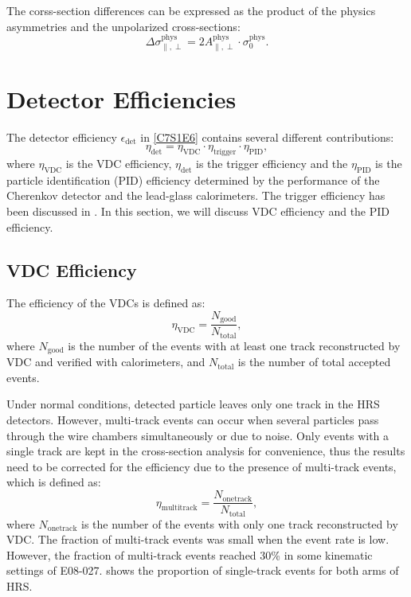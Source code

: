 The corss-section differences can be expressed as the product of the physics asymmetries and the unpolarized cross-sections:
\begin{equation} \label{C7S1E9}
\Delta\sigma_{\parallel,\perp}^{\mathrm{phys}} = 2A_{\parallel,\perp}^{\mathrm{phys}}\cdot\sigma_0^{\mathrm{phys}}.
\end{equation}

\section{Detector Efficiencies}
\label{C7S2}

The detector efficiency $\epsilon_{\mathrm{det}}$ in \cref{C7S1E6} contains several different contributions:
\begin{equation} \label{C7S2E1}
\eta_{\mathrm{det}} = \eta_{\mathrm{VDC}}\cdot\eta_{\mathrm{trigger}}\cdot\eta_{\mathrm{PID}},
\end{equation}
where $\eta_{\mathrm{VDC}}$ is the VDC efficiency, $\eta_{\mathrm{det}}$ is the trigger efficiency and the $\eta_{\mathrm{PID}}$ is the particle identification (PID) efficiency determined by the performance of the Cherenkov detector and the lead-glass calorimeters. The trigger efficiency has been discussed in . In this section, we will discuss VDC efficiency and the PID efficiency.

\subsection{VDC Efficiency}
\label{C7S2SS1}

The efficiency of the VDCs is defined as:
\begin{equation} \label{C7S2E2}
\eta_{\mathrm{VDC}} = \frac{N_{\mathrm{good}}}{N_{\mathrm{total}}},
\end{equation}
where $N_{\mathrm{good}}$ is the number of the events with at least one track reconstructed by VDC and verified with calorimeters, and $N_{\mathrm{total}}$ is the number of total accepted events.

Under normal conditions, detected particle leaves only one track in the HRS detectors. However, multi-track events can occur when several particles pass through the wire chambers simultaneously or due to noise. Only events with a single track are kept in the cross-section analysis for convenience, thus the results need to be corrected for the efficiency due to the presence of multi-track events, which is defined as:
\begin{equation} \label{C7S2E3}
\eta_{\mathrm{multitrack}} = \frac{N_{\mathrm{onetrack}}}{N_{\mathrm{total}}},
\end{equation}
where $N_{\mathrm{onetrack}}$ is the number of the events with only one track reconstructed by VDC. The fraction of multi-track events was small when the event rate is low. However, the fraction of multi-track events reached 30\% in some kinematic settings of E08-027.  shows the proportion of single-track events for both arms of HRS.

